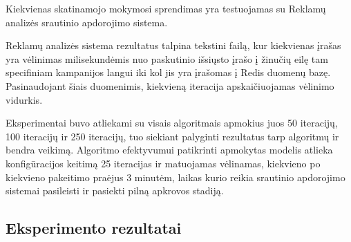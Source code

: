 \documentclass{VUMIFPSbakalaurinis}
\begin{document}
Kiekvienas skatinamojo mokymosi sprendimas yra testuojamas su Reklamų analizės srautinio apdorojimo sistema.

Reklamų analizės sistema rezultatus talpina tekstini failą, kur kiekvienas įrašas yra vėlinimas milisekundėmis nuo paskutinio išsiųsto įrašo į žinučių eilę tam specifiniam kampanijos langui iki kol jis yra įrašomas į Redis duomenų bazę. Pasinaudojant šiais duomenimis, kiekvieną iteracija apskaičiuojamas vėlinimo vidurkis. 

Eksperimentai buvo atliekami su visais algoritmais apmokius juos 50 iteracijų, 100 iteracijų ir 250 iteracijų, tuo siekiant palyginti rezultatus tarp algoritmų ir bendra veikimą. Algoritmo efektyvumui patikrinti apmokytas modelis atlieka konfigūracijos keitimą 25 iteracijas ir matuojamas vėlinamas, kiekvieno po kiekvieno pakeitimo praėjus 3 minutėm, laikas kurio reikia srautinio apdorojimo sistemai pasileisti ir pasiekti pilną apkrovos stadiją.

\subsection{Eksperimento rezultatai}
\end{document}
